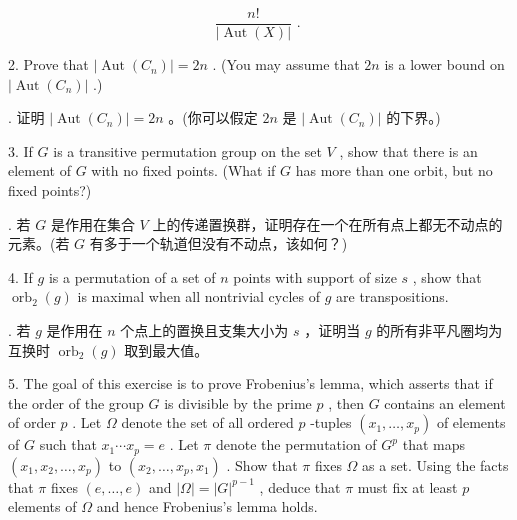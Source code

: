 \documentclass[10pt]{article}
\begin{document}
\[
\frac{n!}{\left| \operatorname{Aut}\left( X\right) \right| }\text{ . }
\]

2. Prove that \(\left| {\operatorname{Aut}\left( {C}_{n}\right) }\right|  = {2n}\) . (You may assume that \({2n}\) is a lower bound on \(\left| {\operatorname{Aut}\left( {C}_{n}\right) }\right|\) .)

\begin{tcolorbox}. 证明 \(\left| {\operatorname{Aut}\left( {C}_{n}\right) }\right|  = {2n}\) 。(你可以假定 \({2n}\) 是 \(\left| {\operatorname{Aut}\left( {C}_{n}\right) }\right|\) 的下界。)
\end{tcolorbox}

3. If \(G\) is a transitive permutation group on the set \(V\) , show that there is an element of \(G\) with no fixed points. (What if \(G\) has more than one orbit, but no fixed points?)

\begin{tcolorbox}. 若 \(G\) 是作用在集合 \(V\) 上的传递置换群，证明存在一个在所有点上都无不动点的元素。(若 \(G\) 有多于一个轨道但没有不动点，该如何？)
\end{tcolorbox}

4. If \(g\) is a permutation of a set of \(n\) points with support of size \(s\) , show that \({\operatorname{orb}}_{2}\left( g\right)\) is maximal when all nontrivial cycles of \(g\) are transpositions.

\begin{tcolorbox}. 若 \(g\) 是作用在 \(n\) 个点上的置换且支集大小为 \(s\) ，证明当 \(g\) 的所有非平凡圈均为互换时 \({\operatorname{orb}}_{2}\left( g\right)\) 取到最大值。
\end{tcolorbox}

5. The goal of this exercise is to prove Frobenius's lemma, which asserts that if the order of the group \(G\) is divisible by the prime \(p\) , then \(G\) contains an element of order \(p\) . Let \(\Omega\) denote the set of all ordered \(p\) -tuples \(\left( {{x}_{1},\ldots ,{x}_{p}}\right)\) of elements of \(G\) such that \({x}_{1}\cdots {x}_{p} = e\) . Let \(\pi\) denote the permutation of \({G}^{p}\) that maps \(\left( {{x}_{1},{x}_{2},\ldots ,{x}_{p}}\right)\) to \(\left( {{x}_{2},\ldots ,{x}_{p},{x}_{1}}\right)\) . Show that \(\pi\) fixes \(\Omega\) as a set. Using the facts that \(\pi\) fixes \(\left( {e,\ldots ,e}\right)\) and \(\left| \Omega \right|  = {\left| G\right| }^{p - 1}\) , deduce that \(\pi\) must fix at least \(p\) elements of \(\Omega\) and hence Frobenius’s lemma holds.
\end{document}
